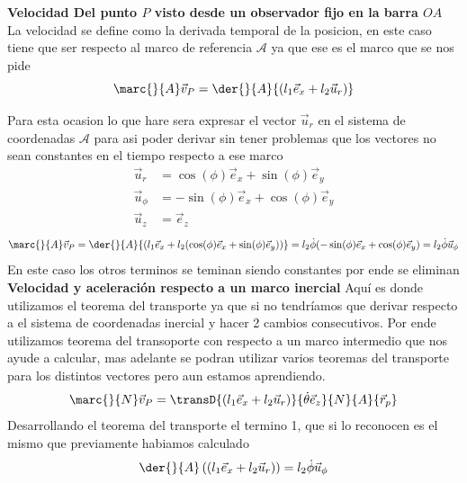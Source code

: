 \begin{tcolorbox}[title=Solucion,breakable]
\textbf{Velocidad Del punto $P$ visto desde un observador fijo en la barra $OA$}\\
La velocidad se define como la derivada temporal de la posicion, en este caso tiene que ser respecto al marco de referencia $\mathcal{A}$ ya que ese es el marco que se nos pide
\begin{equation}
            \marc{}{A}\vec{v}_P=\der{}{A}{(l_1\vec{e}_x+l_2\vec{u}_r)} 
        \end{equation}


        Para esta ocasion lo que hare sera expresar el vector $\vec{u}_r$ en el sistema de coordenadas $\mathcal{A}$ para asi poder derivar sin tener problemas que los vectores no sean constantes en el tiempo respecto a ese marco
        \begin{equation*}
\begin{split}
    \vec{u}_r&=\cos(\phi)\vec{e}_x+\sin(\phi)\vec{e}_y\\
    \vec{u}_\phi&=-\sin(\phi)\vec{e}_x+\cos(\phi)\vec{e}_y\\
    \vec{u}_z&=\vec{e}_z
\end{split}
\end{equation*}
\begin{equation}
            \marc{}{A}\vec{v}_P=\der{}{A}{(l_1\vec{e}_x+l_2(\cos(\phi)\vec{e}_x+\sin(\phi)\vec{e}_y))}=l_2\dot\phi(-\sin(\phi)\vec{e}_x+\cos(\phi)\vec{e}_y) =l_2\dot\phi\vec{u}_\phi
\end{equation}
En este caso los otros terminos se teminan siendo constantes por ende se eliminan\\
        \textbf{Velocidad y aceleración respecto a un marco inercial}
        Aquí es donde utilizamos el teorema del transporte ya que si no tendríamos que derivar respecto a el sistema de coordenadas inercial y hacer 2 cambios consecutivos. Por ende utilizamos teorema del transoporte con respecto a un marco intermedio que nos ayude a calcular, mas adelante se podran utilizar varios teoremas del transporte para los distintos vectores pero aun estamos aprendiendo.
        \begin{equation}
            \marc{}{N}\vec{v}_P=\transD{(l_1\vec{e}_x+l_2\vec{u}_r)}{\dot\theta\vec{e}_z}{N}{A}{\vec{r}_p}
        \end{equation}
        Desarrollando el teorema del transporte el termino 1, que si lo reconocen es el mismo que previamente habiamos calculado
        \begin{align}
            \der{}{A}\left((l_1\vec{e}_x+l_2\vec{u}_r)\right)=l_2\dot\phi\vec{u}_\phi

\end{align}
\end{tcolorbox}
